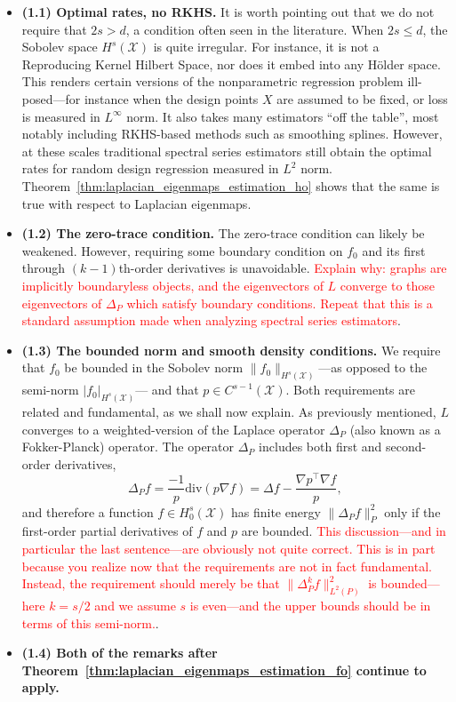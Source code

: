\documentclass{article}
\newcommand{\1}{\mathbf{1}}
\newcommand{\Leb}{L}
\newcommand{\mc}[1]{\mathcal{#1}}
\theoremstyle{alden}
\theoremstyle{aldenthm}
\theoremstyle{definition}
\theoremstyle{remark}
\begin{document}
\begin{itemize}
	\item \textbf{(1.1) Optimal rates, no RKHS.} It is worth pointing out that we do not require that $2s > d$, a condition often seen in the literature. When $2s \leq d$, the Sobolev space $H^s(\mc{X})$ is quite irregular. For instance, it is not a Reproducing Kernel Hilbert Space, nor does it embed into any H\"{o}lder space. This renders certain versions of the nonparametric regression problem ill-posed---for instance when the design points $X$ are assumed to be fixed, or loss is measured in $\Leb^{\infty}$ norm. It also takes many estimators ``off the table'', most notably including RKHS-based methods such as smoothing splines. However, at these scales traditional spectral series estimators still obtain the optimal rates for random design regression measured in $\Leb^2$ norm. Theorem~\ref{thm:laplacian_eigenmaps_estimation_ho} shows that the same is true with respect to Laplacian eigenmaps.
	\item \textbf{(1.2) The zero-trace condition.} The zero-trace condition can likely be weakened. However, requiring some boundary condition on $f_0$ and its first through $(k -1 )$th-order derivatives is unavoidable. \textcolor{red}{Explain why: graphs are implicitly boundaryless objects, and the eigenvectors of $L$ converge to those eigenvectors of $\Delta_P$ which satisfy boundary conditions. Repeat that this is a standard assumption made when analyzing spectral series estimators}.
	\item \textbf{(1.3) The bounded norm and smooth density conditions.} We require that $f_0$ be bounded in the Sobolev norm $\|f_0\|_{H^s(\mc{X})}$---as opposed to the semi-norm $|f_0|_{H^s(\mc{X})}$--- and that $p \in C^{s - 1}(\mc{X})$. Both requirements are related and fundamental, as we shall now explain. As previously mentioned, $L$ converges to a weighted-version of the Laplace operator $\Delta_P$ (also known as a Fokker-Planck) operator. The operator $\Delta_P$ includes both first and second-order derivatives,
	\begin{equation}
	\label{eqn:fokker_planck_1}
	\Delta_Pf= \frac{-1}{p} \mathrm{div}(p \nabla f) = \Delta f - \frac{\nabla p^{\top} \nabla f}{p},
	\end{equation}
	and therefore a function $f \in H_0^s(\mc{X})$ has finite energy $\|\Delta_P f\|_{P}^2$ only if the first-order partial derivatives of $f$ and $p$ are bounded. \textcolor{red}{This discussion---and in particular the last sentence---are obviously not quite correct. This is in part because you realize now that the requirements are not in fact fundamental. Instead, the requirement should merely be that $\|\Delta_P^kf\|_{\Leb^2(P)}^2$ is bounded---here $k = s/2$ and we assume $s$ is even---and the upper bounds should be in terms of this semi-norm.}.
	\item \textbf{(1.4) Both of the remarks after Theorem~\ref{thm:laplacian_eigenmaps_estimation_fo} continue to apply.}
\end{itemize}
\end{document}
